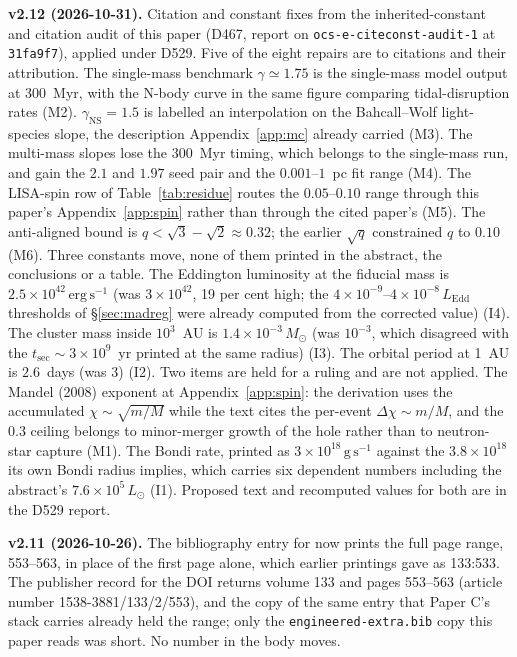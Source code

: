 \documentclass[11pt]{article}
\newcommand{\msun}{\ensuremath{M_\odot}}
\begin{document}
\textbf{v2.12 (2026-10-31).} Citation and constant fixes from the inherited-constant and citation audit of this paper (D467, report on \texttt{ocs-e-citeconst-audit-1} at \texttt{31fa9f7}), applied under D529. Five of the eight repairs are to citations and their attribution. The single-mass benchmark $\gamma \simeq 1.75$ is the \citet{GonzalezPrieto2025} single-mass model output at $300$~Myr, with the \citet{Baumgardt2004} N-body curve in the same figure comparing tidal-disruption rates (M2). $\gamma_{\mathrm{NS}} = 1.5$ is labelled an interpolation on the Bahcall--Wolf light-species slope, the description Appendix~\ref{app:mc} already carried (M3). The multi-mass slopes lose the $300$~Myr timing, which belongs to the single-mass run, and gain the $2.1$ and $1.97$ seed pair and the $0.001$--$1$~pc fit range (M4). The LISA-spin row of Table~\ref{tab:residue} routes the $0.05$--$0.10$ range through this paper's Appendix~\ref{app:spin} rather than through the cited paper's (M5). The \citet{Fishbach2017} anti-aligned bound is $q < \sqrt3-\sqrt2 \approx 0.32$; the earlier $\sqrt q$ constrained $q$ to $0.10$ (M6). Three constants move, none of them printed in the abstract, the conclusions or a table. The Eddington luminosity at the fiducial mass is $2.5\times10^{42}\,\mathrm{erg\,s^{-1}}$ (was $3\times10^{42}$, 19 per cent high; the $4\times10^{-9}$--$4\times10^{-8}\,L_{\mathrm{Edd}}$ thresholds of \S\ref{sec:madreg} were already computed from the corrected value) (I4). The cluster mass inside $10^{3}$~AU is $1.4\times10^{-3}\,\msun$ (was $10^{-3}$, which disagreed with the $t_{\mathrm{sec}} \sim 3\times10^{9}$~yr printed at the same radius) (I3). The orbital period at 1~AU is $2.6$~days (was $3$) (I2). Two items are held for a ruling and are not applied. The Mandel (2008) exponent at Appendix~\ref{app:spin}: the derivation uses the accumulated $\chi \sim \sqrt{m/M}$ while the text cites the per-event $\Delta\chi \sim m/M$, and the $0.3$ ceiling belongs to minor-merger growth of the hole rather than to neutron-star capture (M1). The Bondi rate, printed as $3\times10^{18}\,\mathrm{g\,s^{-1}}$ against the $3.8\times10^{18}$ its own Bondi radius implies, which carries six dependent numbers including the abstract's $7.6\times10^{5}\,L_{\odot}$ (I1). Proposed text and recomputed values for both are in the D529 report.

\textbf{v2.11 (2026-10-26).} The bibliography entry for \citet{MerrittBerczikLaun2007} now prints the full page range, 553--563, in place of the first page alone, which earlier printings gave as 133:533. The publisher record for the DOI returns volume 133 and pages 553--563 (article number 1538-3881/133/2/553), and the copy of the same entry that Paper C's stack carries already held the range; only the \texttt{engineered-extra.bib} copy this paper reads was short. No number in the body moves.
\end{document}
